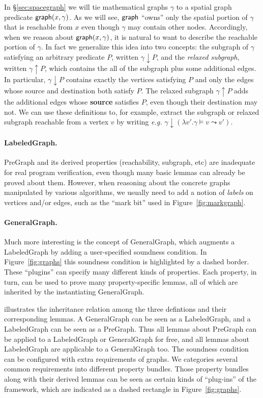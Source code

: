In \S\ref{sec:spacegraph} we will tie mathematical graphs $\gamma$ to a spatial graph predicate
$\mathsf{graph}(x, \gamma)$.   As we will see, $\mathsf{graph}$ ``owns'' only the
spatial portion of $\gamma$ that is reachable
from $x$ even though $\gamma$ may contain other nodes.  Accordingly, when we reason about
$\mathsf{graph}(x, \gamma)$, it is natural to want to describe the
reachable portion of $\gamma$.  In fact we generalize this
idea into two concepts: the subgraph of $\gamma$ satisfying
an arbitrary predicate $P$, written $\gamma \!\downarrow\! P$, and the \emph{relaxed subgraph}, written $\gamma \!\uparrow\! P$, which contains the all of the subgraph plus some additional edges.  In particular, $\gamma \!\downarrow\! P$ contains exactly the vertices satisfying $P$ and only the edges whose source and destination both satisfy $P$.  The relaxed subgraph $\gamma \!\uparrow\! P$ adds the additional edges whose \textbf{source} satisfies $P$, even though their destination may not.
We can use these definitions to, for example, extract the subgraph or relaxed subgraph reachable from a vertex $v$ by writing \emph{e.g.} $\gamma \!\downarrow\! (\lambda v'. \gamma\models v \leadsto v')$.

\paragraph{LabeledGraph.} 
PreGraph and its derived properties (reachability, subgraph, etc) are
inadequate for real program verification, even though many basic lemmas can already be proved about them.
However, when reasoning about the concrete graphs manipulated by various algorithms, 
we usually need to add a notion of \emph{labels} on vertices and/or edges, such as
the ``mark bit'' used in Figure~\ref{fig:markgraph}.

\paragraph{GeneralGraph.}
Much more interesting is the concept of GeneralGraph, which augments a LabeledGraph by adding a user-specified soundness condition.  In Figure~\ref{fig:graphs} this soundness condition is highlighted by a dashed border.  These ``plugins'' can specify many different kinds of properties.  Each property, in turn, can be used to prove many property-specific lemmas, all of which are inherited by the instantiating GeneralGraph.


illustrates the inheritance relation among the
three defintions and their corresponding lemmas. A GeneralGraph can be
seen as a LabeledGraph, and a LabeledGraph can be seen as a
PreGraph. Thus all lemmas about PreGraph can be applied to a
LabeledGraph or GeneralGraph for free, and all lemmas about
LabeledGraph are applicable to a GeneralGraph too. The soundness
condition can be configured with extra requirements of graphs. We
categories several common requirements into different property
bundles. Those property bundles along with their derived lemmas can be
seen as certain kinds of ``plug-ins'' of the framework, which are
indicated as a dashed rectangle in Figure~\ref{fig:graphs}.

